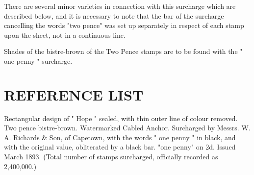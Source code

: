 There are several minor varieties in connection with this surcharge 
which are described below, and it is necessary to note that the 
bar of the surcharge cancelling the words "two pence" was set 
up separately in respect of each stamp upon the sheet, not in a continuous line.




Shades of the bistre-brown of the Two Pence stamps are to 
be found with the " one penny " surcharge.

 
\section{REFERENCE LIST}

Rectangular design of " Hope " sealed, with thin outer 
line of colour removed. Two pence bistre-brown. 
Watermarked Cabled Anchor. 
Surcharged by Messrs. W. A. Richards \& Son, of Capetown, 
with the words " one penny " in black, and with the original value, 
obliterated by a black bar.
"one penny" on 2d. Issued March 1893.
(Total number of stamps surcharged, officially recorded as 2,400,000.)
                            